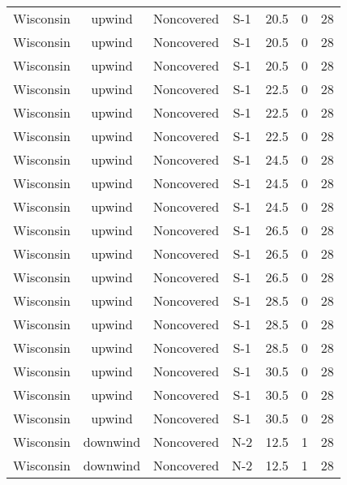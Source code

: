 \documentclass{article}
\begin{document}
\begin{longtable}[c]{ccccccc}
Wisconsin & upwind    & Noncovered & S-1             & 20.5         & 0           & 28  \\
Wisconsin & upwind    & Noncovered & S-1             & 20.5         & 0           & 28  \\
Wisconsin & upwind    & Noncovered & S-1             & 20.5         & 0           & 28  \\
Wisconsin & upwind    & Noncovered & S-1             & 22.5         & 0           & 28  \\
Wisconsin & upwind    & Noncovered & S-1             & 22.5         & 0           & 28  \\
Wisconsin & upwind    & Noncovered & S-1             & 22.5         & 0           & 28  \\
Wisconsin & upwind    & Noncovered & S-1             & 24.5         & 0           & 28  \\
Wisconsin & upwind    & Noncovered & S-1             & 24.5         & 0           & 28  \\
Wisconsin & upwind    & Noncovered & S-1             & 24.5         & 0           & 28  \\
Wisconsin & upwind    & Noncovered & S-1             & 26.5         & 0           & 28  \\
Wisconsin & upwind    & Noncovered & S-1             & 26.5         & 0           & 28  \\
Wisconsin & upwind    & Noncovered & S-1             & 26.5         & 0           & 28  \\
Wisconsin & upwind    & Noncovered & S-1             & 28.5         & 0           & 28  \\
Wisconsin & upwind    & Noncovered & S-1             & 28.5         & 0           & 28  \\
Wisconsin & upwind    & Noncovered & S-1             & 28.5         & 0           & 28  \\
Wisconsin & upwind    & Noncovered & S-1             & 30.5         & 0           & 28  \\
Wisconsin & upwind    & Noncovered & S-1             & 30.5         & 0           & 28  \\
Wisconsin & upwind    & Noncovered & S-1             & 30.5         & 0           & 28  \\
Wisconsin & downwind  & Noncovered & N-2             & 12.5         & 1           & 28  \\
Wisconsin & downwind  & Noncovered & N-2             & 12.5         & 1           & 28  \\

\end{longtable}
\end{document}
